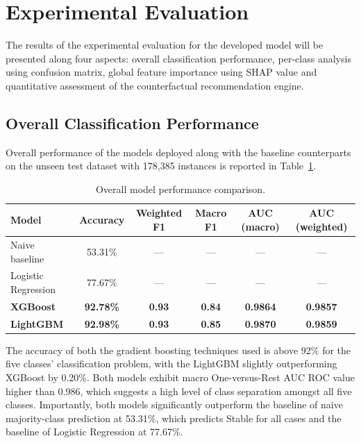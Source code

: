 \section{Experimental Evaluation}

The results of the experimental evaluation for the developed model will be presented along four aspects: overall classification performance, per-class analysis using confusion matrix, global feature importance using SHAP value and quantitative assessment of the counterfactual recommendation engine.

\subsection{Overall Classification Performance}

Overall performance of the models deployed along with the baseline counterparts on the unseen test dataset with 178,385 instances is reported in Table~\ref{tab:overall}.

\begin{table}[htbp]
\centering
\caption{Overall model performance comparison.}
\label{tab:overall}
\begin{tabular}{lccccc}
\hline
\textbf{Model} & \textbf{Accuracy} & \textbf{Weighted F1} & \textbf{Macro F1} & \textbf{AUC (macro)} & \textbf{AUC (weighted)} \\
\hline
Naive baseline & 53.31\% & --- & --- & --- & --- \\
Logistic Regression & 77.67\% & --- & --- & --- & --- \\
\textbf{XGBoost} & \textbf{92.78\%} & \textbf{0.93} & \textbf{0.84} & \textbf{0.9864} & \textbf{0.9857} \\
\textbf{LightGBM} & \textbf{92.98\%} & \textbf{0.93} & \textbf{0.85} & \textbf{0.9870} & \textbf{0.9859} \\
\hline
\end{tabular}
\end{table}

The accuracy of both the gradient boosting techniques used is above 92\% for the five classes' classification problem, with the LightGBM slightly outperforming XGBoost by 0.20\%. Both models exhibit macro One-versus-Rest AUC ROC value higher than 0.986, which suggests a high level of class separation amongst all five classes. Importantly, both models significantly outperform the baseline of naive majority-class prediction at 53.31\%, which predicts Stable for all cases and the baseline of Logistic Regression at 77.67\%.

